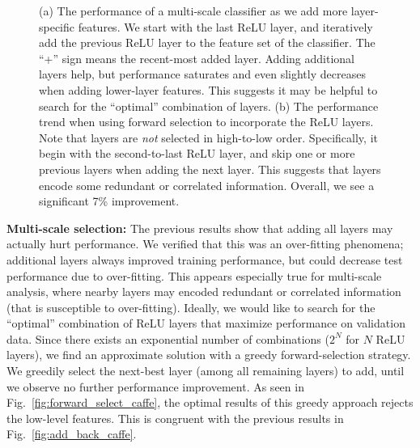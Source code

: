 \documentclass[10pt,twocolumn,letterpaper]{article}
\begin{document}
\begin{figure}[t!]
\centering
\caption{ (a) The performance of a multi-scale classifier as we add more layer-specific features. We start with the last ReLU layer, and iteratively add the previous ReLU layer to the feature set of the classifier.
The ``+'' sign means the recent-most added layer. Adding additional layers help, but performance saturates and even slightly decreases when adding lower-layer features. This suggests it may be helpful to search for the ``optimal'' combination of layers. (b) The performance trend when using forward selection to incorporate the ReLU layers. Note that layers are {\em not} selected in high-to-low order. Specifically, it begin with the second-to-last ReLU layer, and skip one or more previous layers when adding the next layer. This suggests that layers encode some redundant or correlated information. Overall, we see a significant 7\% improvement.}
\label{fig:add_back}
\end{figure}

{\bf Multi-scale selection:} The previous results show that adding all layers may actually hurt performance. We verified that this was an over-fitting phenomena; additional layers always improved training performance, but could decrease test performance due to over-fitting. This appears especially true for multi-scale analysis, where nearby layers may encoded redundant or correlated information (that is susceptible to over-fitting). Ideally, we would like to search for the ``optimal'' combination of ReLU layers that maximize performance on validation data. Since there exists an exponential number of combinations ($2^N$ for $N$ ReLU layers), we find an approximate solution with a greedy forward-selection strategy. We greedily select the next-best layer (among all remaining layers) to add, until we observe no further performance improvement. As seen in Fig.~\ref{fig:forward_select_caffe}, the optimal results of this greedy approach rejects the low-level features. This is congruent with the previous results in Fig.~\ref{fig:add_back_caffe}. 
\end{document}
